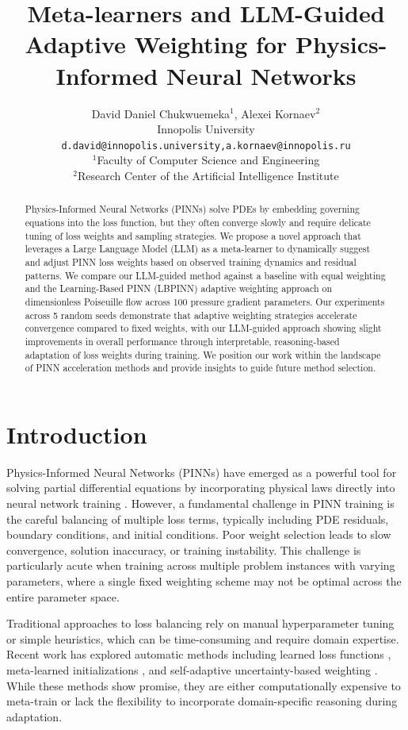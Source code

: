 \documentclass{article}
\title{Meta-learners and LLM-Guided Adaptive Weighting for Physics-Informed Neural Networks}
\author{
David Daniel Chukwuemeka$^{1}$, \quad Alexei Kornaev$^{2}$ \\
Innopolis University \\
\texttt{d.david@innopolis.university,a.kornaev@innopolis.ru}\\
$^{1}$Faculty of Computer Science and Engineering \\
$^{2}$Research Center of the Artificial Intelligence
Institute \\
}
\begin{document}
\maketitle

\begin{abstract}
Physics-Informed Neural Networks (PINNs) solve PDEs by embedding governing equations into the loss function, but they often converge slowly and require delicate tuning of loss weights and sampling strategies. We propose a novel approach that leverages a Large Language Model (LLM) as a meta-learner to dynamically suggest and adjust PINN loss weights based on observed training dynamics and residual patterns. We compare our LLM-guided method against a baseline with equal weighting and the Learning-Based PINN (LBPINN) adaptive weighting approach on dimensionless Poiseuille flow across 100 pressure gradient parameters. Our experiments across 5 random seeds demonstrate that adaptive weighting strategies accelerate convergence compared to fixed weights, with our LLM-guided approach showing slight improvements in overall performance through interpretable, reasoning-based adaptation of loss weights during training. We position our work within the landscape of PINN acceleration methods and provide insights to guide future method selection.
\end{abstract}

\section{Introduction}

Physics-Informed Neural Networks (PINNs) have emerged as a powerful tool for solving partial differential equations by incorporating physical laws directly into neural network training \citep{Raissi2019}. However, a fundamental challenge in PINN training is the careful balancing of multiple loss terms, typically including PDE residuals, boundary conditions, and initial conditions. Poor weight selection leads to slow convergence, solution inaccuracy, or training instability. This challenge is particularly acute when training across multiple problem instances with varying parameters, where a single fixed weighting scheme may not be optimal across the entire parameter space.

Traditional approaches to loss balancing rely on manual hyperparameter tuning or simple heuristics, which can be time-consuming and require domain expertise. Recent work has explored automatic methods including learned loss functions \citep{Psaros2022MetaLoss}, meta-learned initializations \citep{Penwarden2021MetalearningPINNs}, and self-adaptive uncertainty-based weighting \citep{Bischof2021LBPINN}. While these methods show promise, they are either computationally expensive to meta-train or lack the flexibility to incorporate domain-specific reasoning during adaptation.
\end{document}
